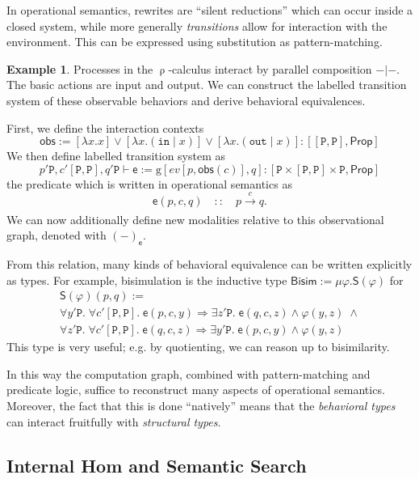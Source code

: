 \documentclass[12pt]{article}
\theoremstyle{definition}
\newtheorem{example}[theorem]{Example}
\newcommand{\msf}[1]{\mathsf{#1}}
\newcommand{\mrm}[1]{\mathrm{#1}}
\newcommand{\mtt}[1]{\mathtt{#1}}
\newcommand{\xr}[2]{\xrightarrow[#2]{#1}}
\newcommand{\ra}{\Rightarrow}
\newcommand{\Prop}{\msf{Prop}}
\newcommand{\PP}{\mtt{P}}
\newcommand{\tto}{\mtt{out}}
\newcommand{\tti}{\mtt{in}}
\begin{document}
In operational semantics, rewrites are ``silent reductions'' which can occur inside a closed system, while more generally \textit{transitions} allow for interaction with the environment. This can be expressed using substitution as pattern-matching.
\begin{example}
    Processes in the $\uprho$-calculus interact by parallel composition $-|-$. The basic actions are input and output. We can construct the labelled transition system of these observable behaviors and derive behavioral equivalences.
    
    First, we define the interaction contexts
    \[\msf{obs}:= [\lambda x.x]\lor [ \lambda x.(\tti\;|\; x)]\lor [ \lambda x.(\tto \;|\; x)]:[[\PP,\PP],\Prop]\]
    We then define labelled transition system as
    \[p'\PP,c'[\PP,\PP],q'\PP\vdash \msf{e}:=\mrm{g}[ev[p,\msf{obs}(c)],q]:[\PP\times[\PP,\PP]\times\PP,\Prop]\]
    the predicate which is written in operational semantics as
    \[\msf{e}(p,c,q) \quad :: \quad p\xr{c}{} q.\]
    We can now additionally define new modalities relative to this observational graph, denoted with $(-)_\msf{e}$.
    
    From this relation, many kinds of behavioral equivalence can be written explicitly as types. For example, bisimulation is the inductive type $\msf{Bisim}:=\mu \varphi.\msf{S}(\varphi)$ for
    \[\begin{array}{l}
        \msf{S}(\varphi)(p,q) :=\\
        \forall y'\PP.\; \forall c'[\PP,\PP].\; \msf{e}(p,c,y)
        \ra \exists z'\PP.\; \msf{e}(q,c,z) \land \varphi(y,z) \; \land \\
        \forall z'\PP.\; \forall c'[\PP,\PP].\; \msf{e}(q,c,z)
        \ra \exists y'\PP.\; \msf{e}(p,c,y) \land \varphi(y,z)
    \end{array}\]
    This type is very useful; e.g. by quotienting, we can reason up to bisimilarity.
    
    In this way the computation graph, combined with pattern-matching and predicate logic, suffice to reconstruct many aspects of operational semantics. Moreover, the fact that this is done ``natively'' means that the \textit{behavioral types} can interact fruitfully with \textit{structural types}.
\end{example}

\subsection{Internal Hom and Semantic Search}
\label{ssec:hom}
\end{document}
